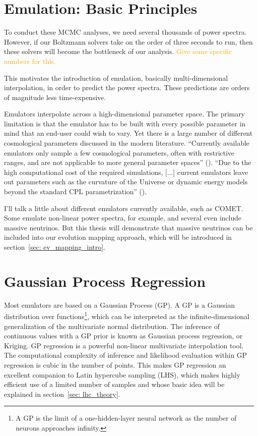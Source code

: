 \section{Emulation: Basic Principles}
\label{sec: emulation_intro}

To conduct these MCMC analyses, we need several thousands of power spectra. However, if our Boltzmann solvers take on the order of three seconds to run, then these solvers will become the bottleneck of our analysis. \textcolor{orange}{Give some specific numbers for this.}

This motivates the introduction of emulation, basically multi-dimensional interpolation, in order to predict the power spectra. These predictions are orders of magnitude less time-expensive. 

Emulators interpolate across a high-dimensional parameter space. The primary
limitation is that the emulator has to be built with every possible parameter
in mind that an end-user could wish to vary. Yet there is a large number of
different cosmological parameters discussed in the modern literature.
``Currently available emulators only sample a few cosmological parameters,
often with restrictive ranges, and are not applicable to more general
parameter
spaces'' (). ``Due to the high computational cost of the required
simulations, [...] current emulators leave out parameters such as the
curvature
of the Universe or dynamic energy models beyond the standard CPL
parametrization'' ().

I'll talk a little about different emulators currently available, such as COMET. Some emulate non-linear power spectra, for example, and several even include massive neutrinos. But this thesis will demonstrate that massive neutrinos can be included into our evolution mapping approach, which will be introduced in section~\ref{sec: ev_mapping_intro}.


\section{Gaussian Process Regression}
\label{sec: gpr_intro}


Most emulators are based on a Gaussian Process (GP). A GP is a Gaussian
distribution over functions\footnote
{A GP is the limit of a one-hidden-layer neural network as the number of
neurons approaches infinity.}, which can be interpreted
as the infinite-dimensional generalization of the multivariate normal
distribution. The inference of continuous values with a GP prior
is known as Gaussian process regression, or Kriging. GP regression is a
powerful non-linear multivariate interpolation tool. The computational
complexity of inference and likelihood evaluation within GP regression is cubic
in the number of points. This makes GP regression an excellent companion to
Latin hypercube sampling (LHS), which makes highly efficient use of a limited 
number of samples and whose basic idea will be explained in section~\ref{sec:
lhc_theory}.

